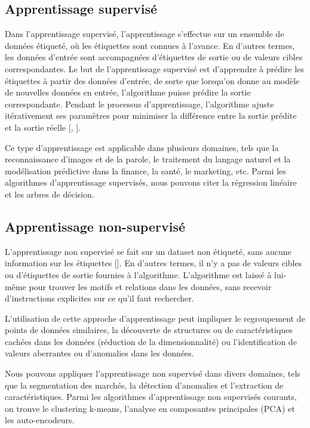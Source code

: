 \subsection{Apprentissage supervisé}
Dans l'apprentissage supervisé, l'apprentissage s'effectue sur un ensemble de
données étiqueté, où les étiquettes sont connues à l'avance. En d'autres
termes, les données d'entrée sont accompagnées d'étiquettes de sortie ou de
valeurs cibles correspondantes. Le but de l'apprentissage supervisé est
d'apprendre à prédire les étiquettes à partir des données d'entrée, de sorte
que lorsqu'on donne au modèle de nouvelles données en entrée, l'algorithme
puisse prédire la sortie correspondante. Pendant le processus d'apprentissage,
l'algorithme ajuste itérativement ses paramètres pour minimiser la différence
entre la sortie prédite et la sortie réelle [\cite{aggarwal_2018},
\cite{Goodfellow-et-al-2016}].

\medskip
Ce type d'apprentissage est applicable dans plusieurs domaines, tels que la reconnaissance d'images et de la parole, le traitement du langage naturel et la modélisation prédictive dans la finance, la santé, le marketing, etc. Parmi les algorithmes d'apprentissage supervisés, nous pouvons citer la régression linéaire et les arbres de décision.

\subsection{Apprentissage non-supervisé}
L'apprentissage non supervisé se fait sur un dataset non étiqueté, sans aucune
information sur les étiquettes [\cite{Goodfellow-et-al-2016}]. En d'autres
termes, il n'y a pas de valeurs cibles ou d'étiquettes de sortie fournies à
l'algorithme. L'algorithme est laissé à lui-même pour trouver les motifs et
relations dans les données, sans recevoir d'instructions explicites sur ce
qu'il faut rechercher.

\medskip
L'utilisation de cette approche d'apprentissage peut impliquer le regroupement de points de données similaires, la découverte de structures ou de caractéristiques cachées dans les données (réduction de la dimensionnalité) ou l'identification de valeurs aberrantes ou d'anomalies dans les données.

\medskip
Nous pouvons appliquer l'apprentissage non supervisé dans divers domaines, tels que la segmentation des marchés, la détection d'anomalies et l'extraction de caractéristiques. Parmi les algorithmes d'apprentissage non supervisés courants, on trouve le clustering k-means, l'analyse en composantes principales (PCA) et les auto-encodeurs.

